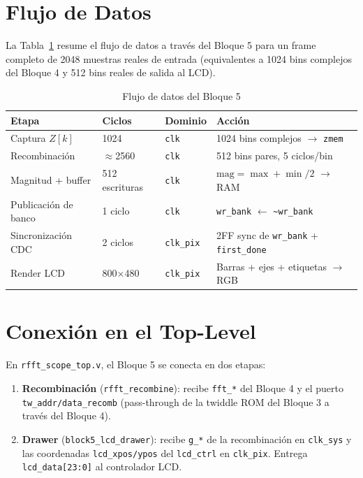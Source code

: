 \documentclass[12pt, a4paper]{article}
\begin{document}
\section{Flujo de Datos}

La Tabla~\ref{tab:dataflow} resume el flujo de datos a través del Bloque 5
para un frame completo de 2048 muestras reales de entrada (equivalentes a
1024 bins complejos del Bloque 4 y 512 bins reales de salida al LCD).

\begin{table}[H]
\centering
\caption{Flujo de datos del Bloque 5}
\label{tab:dataflow}
\begin{tabular}{p{3cm} p{2cm} p{3cm} p{5cm}}
\toprule
\textbf{Etapa} & \textbf{Ciclos} & \textbf{Dominio} & \textbf{Acción} \\
\midrule
Captura $Z[k]$      & 1024 & \texttt{clk}     & 1024 bins complejos $\rightarrow$ \texttt{zmem} \\
Recombinación       & $\approx$2560 & \texttt{clk} & 512 bins pares, 5 ciclos/bin \\
Magnitud + buffer   & 512 escrituras & \texttt{clk}  & $\text{mag} = \max + \min/2$ $\rightarrow$ RAM \\
Publicación de banco& 1 ciclo & \texttt{clk}     & \texttt{wr\_bank} $\leftarrow$ \texttt{\textasciitilde wr\_bank} \\
Sincronización CDC  & 2 ciclos & \texttt{clk\_pix}& 2FF sync de \texttt{wr\_bank} + \texttt{first\_done} \\
Render LCD          & 800$\times$480 & \texttt{clk\_pix} & Barras + ejes + etiquetas $\rightarrow$ RGB \\
\bottomrule
\end{tabular}
\end{table}

\section{Conexión en el Top-Level}

En \texttt{rfft\_scope\_top.v}, el Bloque 5 se conecta en dos etapas:

\begin{enumerate}[leftmargin=*]
    \item \textbf{Recombinación} (\texttt{rfft\_recombine}): recibe
          \texttt{fft\_*} del Bloque 4 y el puerto \texttt{tw\_addr/data\_recomb}
          (pass-through de la twiddle ROM del Bloque 3 a través del Bloque 4).
    \item \textbf{Drawer} (\texttt{block5\_lcd\_drawer}): recibe
          \texttt{g\_*} de la recombinación en \texttt{clk\_sys} y las
          coordenadas \texttt{lcd\_xpos/ypos} del \texttt{lcd\_ctrl} en
          \texttt{clk\_pix}. Entrega \texttt{lcd\_data[23:0]} al controlador LCD.
\end{enumerate}
\end{document}
